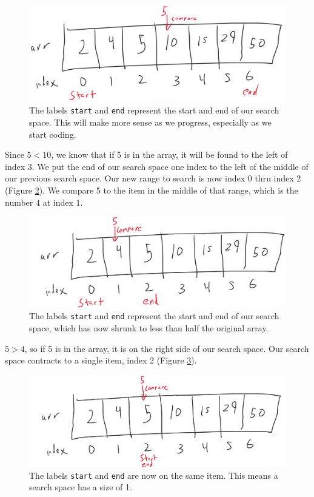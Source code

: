 \begin{figure}[h!]
	\centering
	\includegraphics[width=0.7\linewidth]{pics/binarySearch2}
	\caption{The labels \texttt{start} and \texttt{end} represent the start and end of our search space.  This will make more sense as we progress, especially as we start coding.}
	\label{fig:binarysearch2}
\end{figure}

Since $5 < 10$, we know that if 5 is in the array, it will be found to the left of index 3.  We put the end of our search space one index to the left of the middle of our previous search space.  Our new range to search is now index 0 thru index 2 (Figure \ref{fig:binarysearch3}).  We compare 5 to the item in the middle of that range, which is the number 4 at index 1.  



\begin{figure}[h!]
	\centering
	\includegraphics[width=0.7\linewidth]{pics/binarySearch3}
	\caption{The labels \texttt{start} and \texttt{end} represent the start and end of our search space, which has now shrunk to less than half the original array.}
	\label{fig:binarysearch3}
\end{figure}

$5 > 4$, so if 5 is in the array, it is on the right side of our search space.  Our search space contracts to a single item, index 2 (Figure \ref{fig:binarysearch4}).  

\begin{figure}[h!]
	\centering
	\includegraphics[width=0.7\linewidth]{pics/binarySearch4}
	\caption{The labels \texttt{start} and \texttt{end} are now on the same item.  This means a search space has a size of 1.}
	\label{fig:binarysearch4}
\end{figure}


